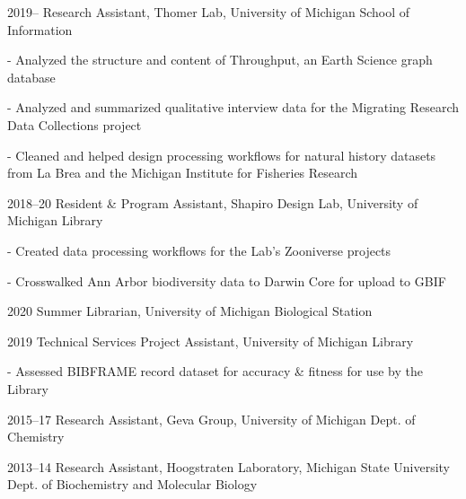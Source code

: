 \documentclass[12pt,letterpaper]{report}
\newcommand{\listitemspace}{0.25em}
\renewenvironment{itemize}
{\begin{list}{}{\setlength{\leftmargin}{0em}
            \setlength{\parskip}{0em}
            \setlength{\itemsep}{\listitemspace}
            \setlength{\parsep}{\listitemspace}}}
{\end{list}}
\begin{document}
\begin{tablist}
    
	\item[2019--] \tab Research Assistant, Thomer Lab, University of Michigan School of Information

	\begin{itemize} \begin{footnotesize}

		\item - Analyzed the structure and content of Throughput, an Earth Science graph database
		
		\item - Analyzed and summarized qualitative interview data for the Migrating Research Data Collections project

		\item - Cleaned and helped design processing workflows for natural history datasets from La Brea and the Michigan Institute for Fisheries Research

	\end{footnotesize} \end{itemize}
        
	\item[2018--20] \tab Resident \& Program Assistant, Shapiro Design Lab, University of Michigan Library

	\begin{itemize} \begin{footnotesize}

		\item - Created data processing workflows for the Lab’s Zooniverse projects 

		\item - Crosswalked Ann Arbor biodiversity data to Darwin Core for upload to GBIF

	\end{footnotesize} \end{itemize}

	\item[2020] \tab Summer Librarian, University of Michigan Biological Station
    
	\item[2019] \tab Technical Services Project Assistant, University of Michigan Library
	
	\begin{itemize} \begin{footnotesize}
	
		\item - Assessed BIBFRAME record dataset for accuracy \& fitness for use by the Library
		
	\end{footnotesize} \end{itemize}

	\item[2015--17] \tab Research Assistant, Geva Group, University of Michigan Dept. of Chemistry
	
	\item[2013--14] \tab Research Assistant, Hoogstraten Laboratory, Michigan State University Dept. of Biochemistry and Molecular Biology

\end{tablist}
\end{document}
